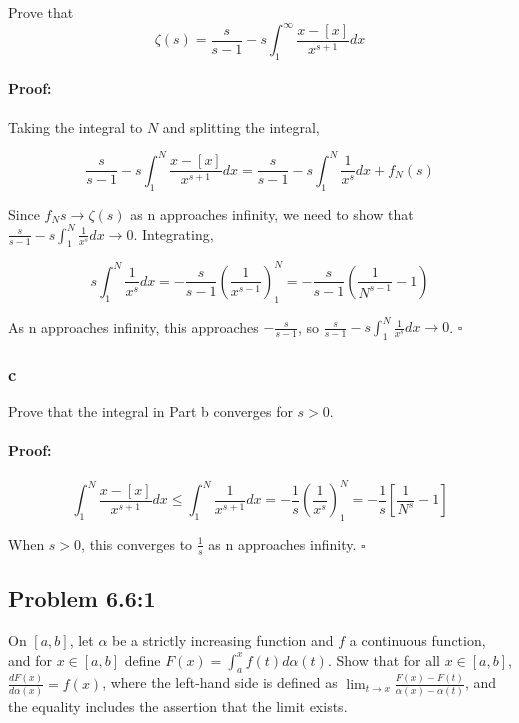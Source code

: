 \documentclass{article}
\newenvironment{proof}{\paragraph{Proof:}}{\hfill$\square$}
\begin{document}
Prove that
\[
\zeta(s) = \frac{s}{s-1} - s\int_1^\infty \frac{x -[x]}{x^{s+1}}dx
\]

\begin{proof}
Taking the integral to $N$ and splitting the integral,

\[
\frac{s}{s-1} - s \int_1^N \frac{x -[x]}{x^{s+1}}dx = \frac{s}{s-1} - s\int_1^N \frac{1}{x^s}dx + f_N(s)
\]

Since $f_N{s} \rightarrow \zeta(s)$ as n approaches infinity, we need to show that $\frac{s}{s-1} - s\int_1^N \frac{1}{x^s}dx \rightarrow 0$. Integrating,

\[
s\int_1^N \frac{1}{x^s}dx = -\frac{s}{s-1} \left( \frac{1}{x^{s-1}} \right)_1^N = -\frac{s}{s-1} \left(\frac{1}{N^{s-1}} - 1\right)
\]

As n approaches infinity, this approaches $-\frac{s}{s-1}$, so $\frac{s}{s-1} - s\int_1^N \frac{1}{x^s}dx \rightarrow 0$.
\end{proof}

\subsubsection*{c}

Prove that the integral in Part b converges for $s > 0$.

\begin{proof}
\[
\int_1^N \frac{x - [x]}{x^{s+1}}dx \leq \int_1^N \frac{1}{x^{s+1}}dx = -\frac{1}{s}\left( \frac{1}{x^s} \right)_1^N = -\frac{1}{s}\left[\frac{1}{N^s} - 1 \right]
\]

When $s>0$, this converges to $\frac{1}{s}$ as n approaches infinity.
\end{proof}

\subsection*{Problem 6.6:1}

On $[a, b]$, let $\alpha$ be a strictly increasing function and $f$ a continuous function, and for $x \in [a, b]$ define $F(x) = \int_a^x f(t) d\alpha(t)$. Show that for all $x \in [a, b]$, $\frac{dF(x)}{d \alpha(x)} = f(x)$, where the left-hand side is defined as $\lim_{t \to x} \frac{F(x) - F(t)}{\alpha(x) - \alpha(t)}$, and the equality includes the assertion that the limit exists.
\end{document}
